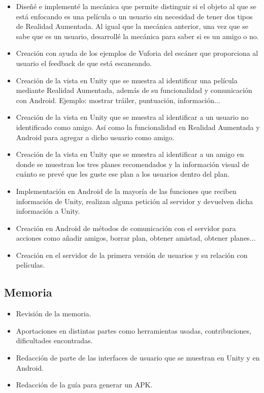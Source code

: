 \begin{itemize}
                    \item Diseñé e implementé la mecánica que permite distinguir si el objeto al que se está enfocando es una película o un usuario sin necesidad de 
                    tener dos tipos de Realidad Aumentada. Al igual que la mecánica anterior, una vez que se sabe que es un usuario, desarrollé la mecánica para saber si es un amigo o no.
                    \item Creación con ayuda de los ejemplos de Vuforia del escáner que proporciona al usuario el feedback de que está escaneando.
                    \item Creación de la vista en Unity que se muestra al identificar una película mediante Realidad Aumentada, además de su funcionalidad y comunicación 
                    con Android. Ejemplo: mostrar tráiler, puntuación, información...
                    \item Creación de la vista en Unity que se muestra al identificar a un usuario no identificado como amigo. Así como la funcionalidad en Realidad Aumentada 
                    y Android para agregar a dicho usuario como amigo.
                    \item Creación de la vista en Unity que se muestra al identificar a un amigo en donde se muestran los tres planes recomendados y la información visual de cuánto 
                    se prevé que les guste ese plan a los usuarios dentro del plan.
                    \item Implementación en Android de la mayoría de las funciones que reciben información de Unity, realizan alguna petición al servidor y devuelven dicha información a Unity.
                    \item Creación en Android de métodos de comunicación con el servidor para acciones como añadir amigos, borrar plan, obtener amistad, obtener planes...
                    \item Creación en el servidor de la primera versión de usuarios y su relación con películas.
                \end{itemize}
            \subsection{Memoria}
            \label{makereference7.3.3}
                \begin{itemize}
                    \item Revisión de la memoria.
                    \item Aportaciones en distintas partes como herramientas usadas, contribuciones, dificultades encontradas.
                    \item Redacción de parte de las interfaces de usuario que se muestran en Unity y en Android.
                    \item Redacción de la guía para generar un APK.
                \end{itemize}
        
